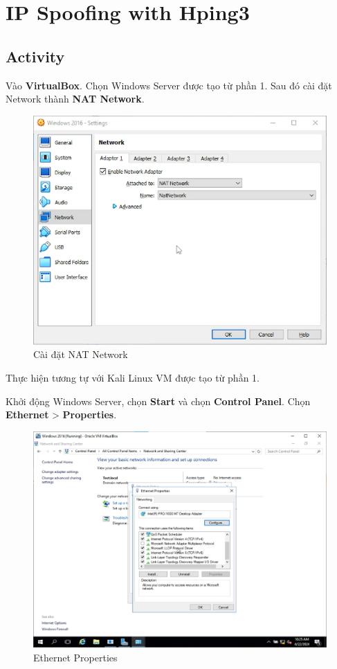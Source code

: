 \newpage

\section{IP Spoofing with Hping3}

\subsection{Activity}

 Vào \textbf{VirtualBox}. Chọn Windows Server được tạo từ phần 1. Sau đó cài đặt Network thành \textbf{NAT Network}.

\begin{figure}[!htb]
    \centering
    \includegraphics[width=0.7\linewidth]{figure//chapter5//lab5_1/nat_network.png}
    \caption{Cài đặt NAT Network}
    \label{fig:enter-label}
\end{figure}

\noindent Thực hiện tương tự với Kali Linux VM được tạo từ phần 1.

 Khởi động Windows Server, chọn \textbf{Start} và chọn \textbf{Control Panel}. Chọn \textbf{Ethernet} > \textbf{Properties}. 

\begin{figure}[!htb]
    \centering
    \includegraphics[width=0.7\linewidth]{figure//chapter5//lab5_2/ethernet_properties.png}
    \caption{Ethernet Properties}
    \label{fig:enter-label}
\end{figure}

